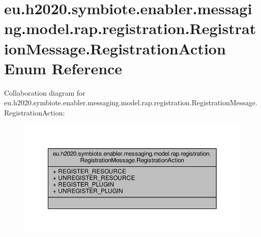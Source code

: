 \hypertarget{enumeu_1_1h2020_1_1symbiote_1_1enabler_1_1messaging_1_1model_1_1rap_1_1registration_1_1Registrat1f4e4e7672b628dc11e563cd077b2d6a}{}\section{eu.\+h2020.\+symbiote.\+enabler.\+messaging.\+model.\+rap.\+registration.\+Registration\+Message.\+Registration\+Action Enum Reference}
\label{enumeu_1_1h2020_1_1symbiote_1_1enabler_1_1messaging_1_1model_1_1rap_1_1registration_1_1Registrat1f4e4e7672b628dc11e563cd077b2d6a}


Collaboration diagram for eu.\+h2020.\+symbiote.\+enabler.\+messaging.\+model.\+rap.\+registration.\+Registration\+Message.\+Registration\+Action\+:
\nopagebreak
\begin{figure}[H]
\begin{center}
\leavevmode
\includegraphics[width=350pt]{enumeu_1_1h2020_1_1symbiote_1_1enabler_1_1messaging_1_1model_1_1rap_1_1registration_1_1Registrat099ef8ee225199d03792795226d06aaa}
\end{center}
\end{figure}
